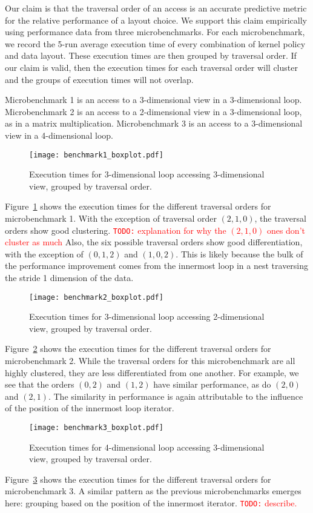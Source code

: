 \documentclass{article}
\newcommand{\todo}[1]{{\textcolor{red}{{\tt{TODO:}}\,\,#1 }}}
\begin{document}
Our claim is that the traversal order of an access is an accurate predictive metric for the relative performance of a layout choice. 
We support this claim empirically using performance data from three microbenchmarks.
For each microbenchmark, we record the 5-run average execution time of every combination of kernel policy and data layout. 
These execution times are then grouped by traversal order.
If our claim is valid, then the execution times for each traversal order will cluster and the groups of execution times will not overlap.

Microbenchmark 1 is an access to a 3-dimensional view in a 3-dimensional loop. 
Microbenchmark 2 is an access to a 2-dimensional view in a 3-dimensional loop, as in a matrix multiplication.
Microbenchmark 3 is an access to a 3-dimensional view in a 4-dimensional loop.



\begin{figure}
  \texttt{[image: benchmark1\_boxplot.pdf]}
  \label{TraversalBenchmark1}
  \caption{Execution times for 3-dimensional loop accessing 3-dimensional view, grouped by traversal order.}
\end{figure}
Figure~\ref{TraversalBenchmark1} shows the execution times for the different traversal orders for microbenchmark 1. 
With the exception of traversal order $(2,1,0)$, the traversal orders show good clustering.
\todo{explanation for why the $(2,1,0)$ ones don't cluster as much}
Also, the six possible traversal orders show good differentiation, with the exception of $(0,1,2)$ and $(1,0,2)$. 
This is likely because the bulk of the performance improvement comes from the innermost loop in a nest traversing the stride 1 dimension of the data.



\begin{figure}
  \texttt{[image: benchmark2\_boxplot.pdf]}
  \label{TraversalBenchmark2}
  \caption{Execution times for 3-dimensional loop accessing 2-dimensional view, grouped by traversal order.}
\end{figure}
Figure~\ref{TraversalBenchmark2} shows the execution times for the different traversal orders for microbenchmark 2. 
While the traversal orders for this microbenchmark are all highly clustered, they are less differentiated from one another. 
For example, we see that the orders $(0,2)$ and $(1,2)$ have similar performance, as do $(2,0)$ and $(2,1)$. 
The similarity in performance is again attributable to the influence of the position of the innermost loop iterator. 

\begin{figure}
  \texttt{[image: benchmark3\_boxplot.pdf]}
  \label{TraversalBenchmark3}
  \caption{Execution times for 4-dimensional loop accessing 3-dimensional view, grouped by traversal order.}
\end{figure}

Figure~\ref{TraversalBenchmark3} shows the execution times for the different traversal orders for microbenchmark 3. 
A similar pattern as the previous microbenchmarks emerges here: grouping based on the position of the innermost iterator. 
\todo{describe.}
\end{document}
